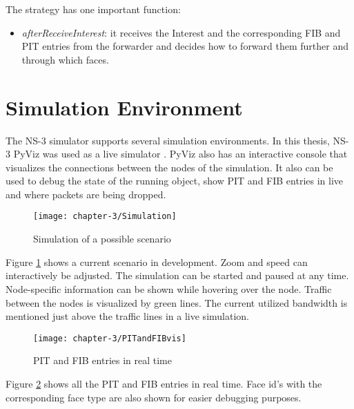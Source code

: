 The strategy has one important function:

\begin{itemize}
\item \emph{afterReceiveInterest}: it receives the Interest and the corresponding FIB and PIT entries from the forwarder and decides how to forward them further and through which faces.
\end{itemize}


\section{Simulation Environment}

The NS-3 simulator supports several simulation environments. In this thesis, NS-3 PyViz was used as a live simulator \cite{pyviz}. PyViz also has an interactive console that visualizes the connections between the nodes of the simulation. It also can be used to debug the state of the running object, show PIT and FIB entries in live and where packets are being dropped.

\vspace{5mm} %

\begin{figure}[H]
  \centering
  \texttt{[image: chapter-3/Simulation]}
  \caption{Simulation of a possible scenario}
  \label{fig:Simulation}
\end{figure}

\vspace{5mm} %

Figure \ref{fig:Simulation} shows a current scenario in development. Zoom and speed can interactively be adjusted. The simulation can be started and paused at any time. Node-specific information can be shown while hovering over the node. Traffic between the nodes is visualized by green lines. The current utilized bandwidth is mentioned just above the traffic lines in a live simulation.

\vspace{5mm} %

\begin{figure}[H]
  \centering
  \texttt{[image: chapter-3/PITandFIBvis]}
  \caption{PIT and FIB entries in real time}
  \label{fig:PITandFIBvis}
\end{figure}

\vspace{5mm} %

Figure \ref{fig:PITandFIBvis} shows all the PIT and FIB entries in real time. Face id's with the corresponding face type are also shown for easier debugging purposes.


